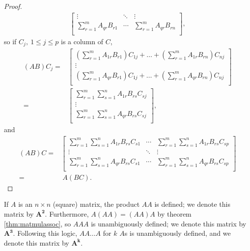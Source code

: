 \documentclass[12pt]{article}
\begin{document}
\begin{thm}
\begin{proof}
\begin{align*}
\begin{bmatrix}
        \vdots
          & \ddots
          & \vdots\\
        \sum_{r = 1}^{m} A_{qr}B_{r1}
          & \cdots
          & \sum_{r = 1}^{m} A_{qr}B_{rn}\\
      \end{bmatrix},
    \end{align*}
    so if $C_j,\ 1 \leq j \leq p$ is a column of $C$,
    \begin{align*}
      (AB)C_j =&
      \begin{bmatrix}
        (\sum_{r = 1}^{m} A_{1r}B_{r1})C_{1j}
          + \ldots
          + (\sum_{r = 1}^{m} A_{1r}B_{rn})C_{nj}\\
        \vdots\\
        (\sum_{r = 1}^{m} A_{qr}B_{r1})C_{1j}
          + \ldots
          + (\sum_{r = 1}^{m} A_{qr}B_{rn})C_{nj}\\
      \end{bmatrix}\\
      =&
      \begin{bmatrix}
        \sum_{r = 1}^{m}\sum_{s = 1}^{n} A_{1r}B_{rs}C_{sj}\\
        \vdots\\
        \sum_{r = 1}^{m}\sum_{s = 1}^{n} A_{qr}B_{rs}C_{sj}\\
      \end{bmatrix},
    \end{align*}
    and
    \begin{align*}
      (AB)C =&
      \begin{bmatrix}
        \sum_{r = 1}^{m}\sum_{s = 1}^{n} A_{1r}B_{rs}C_{s1}
          & \cdots
          & \sum_{r = 1}^{m}\sum_{s = 1}^{n} A_{1r}B_{rs}C_{sp}\\
        \vdots & \ddots & \vdots\\
        \sum_{r = 1}^{m}\sum_{s = 1}^{n} A_{qr}B_{rs}C_{s1}
          & \cdots
          & \sum_{r = 1}^{m}\sum_{s = 1}^{n} A_{qr}B_{rs}C_{sp}\\
      \end{bmatrix}\\
      =&\ A(BC).
    \end{align*}
  \end{proof}
\end{thm}

\begin{defn}
  If $A$ is an $n \times n$ (square) matrix, the product $AA$ is
  defined; we denote this matrix by $\bm{A^2}$. Furthermore,
  $A(AA) = (AA)A$ by theorem \ref{thm:matmulassoc}, so $AAA$ is
  unambiguously defined; we denote this matrix by $\bm{A^3}$.
  Following this logic, $AA\ldots A$ for $k$
  $A$s is unambiguously defined, and we denote this matrix by
  $\bm{A^k}$.
\end{defn}
\end{document}
